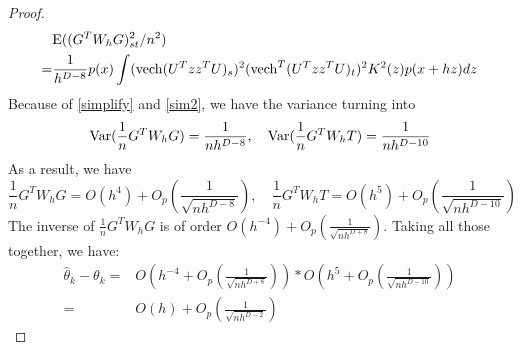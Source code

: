 \documentclass[aos,preprint]{imsart}
\theoremstyle{remark}
\begin{document}
\begin{appendix}
\begin{proof}
\begin{equation}
\begin{aligned}
&{\rm E}((G^TW_hG)^2_{st}/n^2)\\
=& \frac{1}{h^{D-8}} p(x) \int ({\rm vech}(U^T zz^TU)_s)^2  ({\rm vech}^T(U^T zz^TU)_t)^2 K^2(z) p(x+hz)d z\\
\end{aligned}
\end{equation}
Because of \eqref{simplify} and \eqref{sim2}, we have the variance turning into
\[
{\rm Var}(\frac{1}{n}G^TW_hG) = \frac{1}{nh^{D-8}},\quad {\rm Var} (\frac{1}{n}G^TW_hT) = \frac{1}{nh^{D-10}}
\]
As a result, we have
\[
\frac{1}{n}G^TW_hG = O(h^4) + O_p(\frac{1}{\sqrt{nh^{D-8}}}),\quad \frac{1}{n}G^TW_hT = O(h^5) + O_p(\frac{1}{\sqrt{nh^{D-10}}})
\]
The inverse of $\frac{1}{n}G^TW_hG$ is of order $O(h^{-4})+O_p(\frac{1}{\sqrt{nh^{D+8}}})$. Taking all those together, we have:
\[
\begin{aligned}
\hat{\theta}_k - \theta_k =& O(h^{-4}+O_p(\frac{1}{\sqrt{nh^{D+8}}}))*O(h^{5}+O_p(\frac{1}{\sqrt{nh^{D-10}}}))\\
=& O(h) +O_p(\frac{1}{\sqrt{nh^{D-2}}})
\end{aligned}
\]
\end{proof}


\end{appendix}
\end{document}
